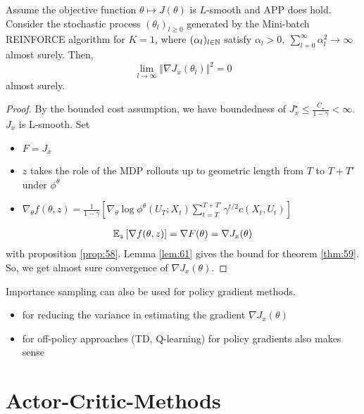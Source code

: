 \begin{theorem}\label{thm:62}
    Assume the objective function  \(\theta\mapsto J(\theta)\) is \(L\)-smooth
    and APP does hold. Consider the stochastic process \((\theta_l)_{l\geq 0}\) generated by 
    the Mini-batch REINFORCE algorithm for \(K=1\), where \((\alpha_l)_{l\in\mathbb{N}}\) satisfy 
    \(\alpha_l>0,\ \sum_{l=0}^{\infty} \alpha_l^2\to\infty\) almost surely. Then, 
    \[\lim_{l\to\infty}\Vert \nabla J_x(\theta_l)\Vert^2=0\] almost surely.
\end{theorem}

\begin{proof}
    By the bounded cost assumption, we have boundedness of \(J_x^\star\leq \frac{C_\star}{1-\gamma}<\infty\).
    \(J_x\) is L-smooth. Set
    \begin{itemize}
        \item \(F=J_x\)
        \item   \(z\) takes the role of the MDP rollouts up to geometric length from \(T\) to \(T+T'\) under \(\phi^\theta\)
        \item \( \nabla_\theta f(\theta,z)=\frac{1}{1-\gamma}\left[\nabla_\theta \log \phi^\theta(U_T;X_t)\sum_{t=T}^{T+T'}\gamma^{t/2}c(X_{t},U_t)\right]\)
    \end{itemize} 

    \begin{align*}
        \mathbb{E}_{z}\left[\nabla f(\theta,z)\right]=\nabla F(\theta)=\nabla J_x(\theta)
    \end{align*}
    with proposition \ref{prop:58}. Lemma \ref{lem:61} gives the bound for theorem \ref{thm:59}.
    So, we get almost sure convergence of \(\nabla J_x(\theta)\).

\end{proof}

\begin{remark}
    Importance sampling can also be used for policy gradient methods. 
    \begin{itemize}
        \item for reducing the variance in estimating the gradient \(\nabla J_x(\theta)\)
        \item for off-policy approaches (TD, Q-learning) for policy gradients also makes sense  
    \end{itemize}
\end{remark}

\section{Actor-Critic-Methods}

